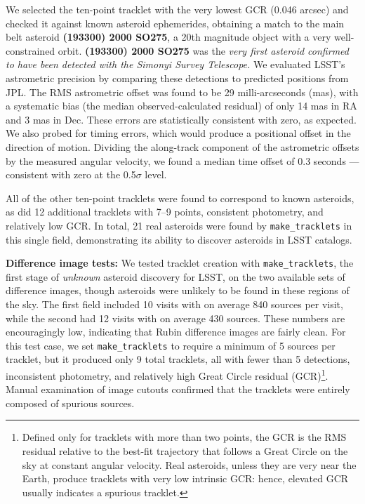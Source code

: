 We selected the ten-point tracklet with the very lowest GCR (0.046 arcsec) and checked it against known asteroid ephemerides, obtaining a match to the main belt asteroid \textbf{(193300) 2000 SO275}, a 20th magnitude object with a very well-constrained orbit. \textbf{(193300) 2000 SO275} was the {\em very first asteroid confirmed to have been detected with the Simonyi Survey Telescope.} We evaluated LSST's astrometric precision by comparing these detections to predicted positions from JPL. The RMS astrometric offset was found to be 29 milli-arcseconds (mas), with a systematic bias (the median observed-calculated residual) of only 14 mas in RA and 3 mas in Dec. These errors are statistically consistent with zero, as expected. We also probed for timing errors, which would produce a positional offset in the direction of motion. Dividing the along-track component of the astrometric offsets by the measured angular velocity, we found a median time offset of 0.3 seconds --- consistent with zero at the 0.5$\sigma$ level.

All of the other ten-point tracklets were found to correspond to known asteroids, as did 12 additional tracklets with 7--9 points, consistent photometry, and relatively low GCR. In total, 21 real asteroids were found by {\tt make\_tracklets} in this single field, demonstrating its ability to discover asteroids in LSST catalogs.


{\bf Difference image tests:} We tested tracklet creation with {\tt make\_tracklets}, the first stage of {\em unknown} asteroid discovery for LSST, on the two available sets of difference images, though asteroids were unlikely to be found in these regions of the sky. The first field included 10 visits with on average 840 sources per visit, while the second had 12 visits with on average 430 sources. These numbers are encouragingly low, indicating that Rubin difference images are fairly clean. For this test case, we set {\tt make\_tracklets} to require a minimum of 5 sources per tracklet, but it produced only 9 total tracklets, all with fewer than 5 detections, inconsistent photometry, and relatively high Great Circle residual (GCR)\footnote{Defined only for tracklets with more than two points, the GCR is the RMS residual relative to the best-fit trajectory that follows a Great Circle on the sky at constant angular velocity. Real asteroids, unless they are very near the Earth, produce tracklets with very low intrinsic GCR: hence, elevated GCR usually indicates a spurious tracklet.}. Manual examination of image cutouts confirmed that the tracklets were entirely composed of spurious sources.

